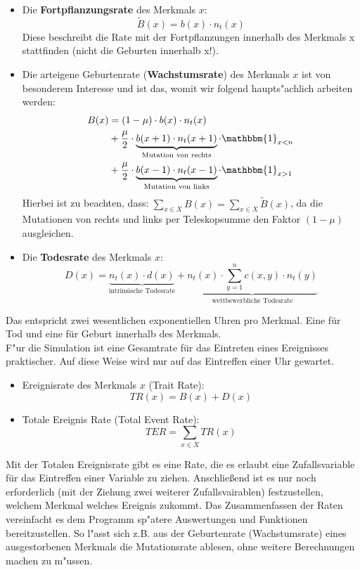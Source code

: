 \documentclass[11pt, a4paper, german]{article}
\theoremstyle{plain}
\begin{document}
	\begin{itemize}
		\item Die \textbf{Fortpflanzungsrate} des Merkmals $ x $: 
		\[ \tilde{B}(x) = b(x) \cdot n_t(x) \]
		Diese beschreibt die Rate mit der Fortpflanzungen innerhalb des Merkmals x stattfinden (nicht die Geburten innerhalb x!).\\
		\item Die arteigene Geburtenrate (\textbf{Wachstumsrate}) des Merkmals $ x $ ist von besonderem Interesse und ist das, womit wir folgend haupts"achlich arbeiten werden: 
		\begin{align*}
			B(x)  & = (1 - \mu) \cdot b(x) \cdot n_t(x)\\
				  & + \frac{\mu}{2} \cdot \underbrace{b(x+1) \cdot n_t(x+1)}_{\text{Mutation von rechts}} \cdot \mathbbm{1}_{x<n}\\
				  & + \frac{\mu}{2} \cdot \underbrace{b(x-1) \cdot n_t(x-1)}_{\text{Mutation von links}} \cdot \mathbbm{1}_{x>1}
		\end{align*}
		Hierbei ist zu beachten, dass: $ \sum_{x \in X} B(x)  = \sum_{x \in X} \tilde{B}(x)$, da die Mutationen von rechts und links per Teleskopsumme den Faktor $ (1-\mu) $ ausgleichen.
		
		\item Die \textbf{Todesrate} des Merkmals $ x $:
		\[ D(x) = \underbrace{n_t(x) \cdot d(x)}_{\text{intrinsische Todesrate}} + \underbrace{n_t(x) \cdot \sum_{y=1}^{n} c(x,y) \cdot n_t(y)}_{\text{wettbewerbliche Todesrate}}  \]
	\end{itemize}
	Das entspricht zwei wesentlichen exponentiellen Uhren pro Merkmal. Eine für Tod und eine für Geburt innerhalb des Merkmals.\\
	F"ur die Simulation ist eine Gesamtrate für das Eintreten eines Ereignisses praktischer. Auf diese Weise wird nur auf das Eintreffen einer Uhr gewartet.
	\begin{itemize}
		\item Ereignisrate des Merkmals $ x $ (Trait Rate):
		\[ TR(x) = B(x) + D(x) \]
		\item Totale Ereignis Rate (Total Event Rate): 
		\[ TER = \sum_{x \in X} TR(x)\]
	\end{itemize}
	Mit der Totalen Ereignisrate gibt es eine Rate, die es erlaubt eine Zufallsvariable für das Eintreffen einer Variable zu ziehen. Anschließend ist es nur noch erforderlich (mit der Ziehung zwei weiterer Zufallsvairablen) festzustellen, welchem Merkmal welches Ereignis zukommt. Das Zusammenfassen der Raten vereinfacht es dem Programm sp"atere Auswertungen und Funktionen bereitzustellen. So l"asst sich z.B. aus der Geburtenrate (Wachstumsrate) eines ausgestorbenen Merkmals die Mutationsrate ablesen, ohne weitere Berechnungen machen zu m"ussen.\\
	
\end{document}
